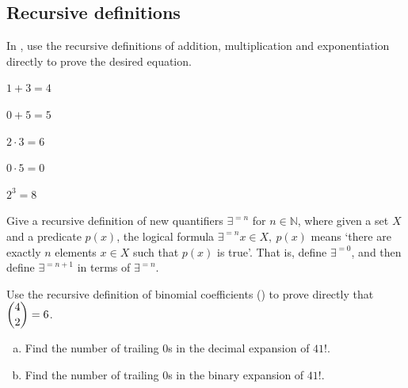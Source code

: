 \subsection*{Recursive definitions}

In , use the recursive definitions of addition, multiplication and exponentiation directly to prove the desired equation.

\begin{chapex}
\label{cqRecursiveDefinitionsOfArithmeticOperationsBegin}
$1+3=4$
\end{chapex}

\begin{chapex}
$0+5=5$
\end{chapex}

\begin{chapex}
$2 \cdot 3 = 6$
\end{chapex}

\begin{chapex}
$0 \cdot 5 = 0$
\end{chapex}

\begin{chapex}
\label{cqRecursiveDefinitionsOfArithmeticOperationsEnd}
$2^3=8$
\end{chapex}

\begin{chapex}
\label{cqRecursiveDefinitionOfExistsExactlyNQuantifier}
Give a recursive definition of new quantifiers $\exists^{=n}$ for $n \in \mathbb{N}$, where given a set $X$ and a predicate $p(x)$, the logical formula $\exists^{=n} x \in X,~ p(x)$ means `there are exactly $n$ elements $x \in X$ such that $p(x)$ is true'. That is, define $\exists^{=0}$, and then define $\exists^{=n+1}$ in terms of $\exists^{=n}$.
\end{chapex}

\begin{chapex}
Use the recursive definition of binomial coefficients () to prove directly that $\dbinom{4}{2} = 6$.
\end{chapex}

\begin{chapex}
\label{cqTrailingZerosInFactorial}
\begin{enumerate}[(a)]
\item Find the number of trailing $0$s in the decimal expansion of $41!$.
\item Find the number of trailing $0$s in the binary expansion of $41!$.
\end{enumerate}
\end{chapex}

